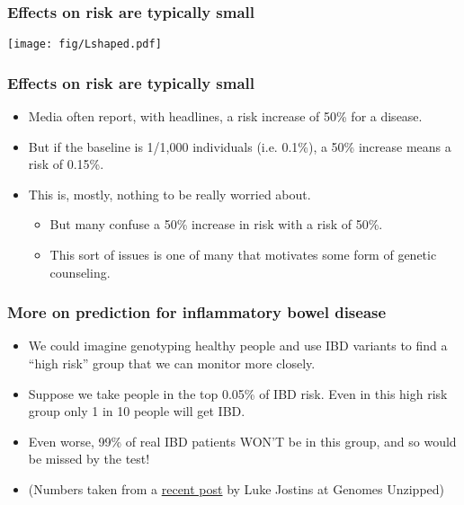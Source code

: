 \documentclass{beamer}
\begin{document}
\begin{frame}
  \frametitle{Effects on risk are typically small}
  \begin{center} 
    \texttt{[image: fig/Lshaped.pdf]}
  \end{center}
\end{frame}


\begin{frame}
  \frametitle{Effects on risk are typically small}
  \begin{itemize} 
    \item Media often report, with headlines, a risk increase of 50\% for a disease.
    \item But if the baseline is 1/1,000 individuals (i.e. 0.1\%), a 50\% increase means a risk of 0.15\%.
    \item This is, mostly, nothing to be really worried about.
      \begin{itemize}
      \item But many confuse a 50\% increase in risk with a risk of 50\%.
      \item This sort of issues is one of many that motivates some form of genetic counseling.
      \end{itemize}
  \end{itemize}
\end{frame}


\begin{frame}
  \frametitle{More on prediction for inflammatory bowel disease}
  \begin{itemize} 
  \item We could imagine genotyping healthy people and use IBD variants to find a “high risk” group that we can monitor more closely.
  \item Suppose we take people in the top 0.05\% of IBD risk. Even in this high risk group only 1 in 10 people will get IBD.
  \item Even worse, 99\% of real IBD patients WON’T be in this group, and so would be missed by the test!
  \item (Numbers taken from a \href{http://www.genomesunzipped.org/2012/11/dozens-of-new-ibd-genes-but-can-they-predict-disease.php\#more-5226}{recent post} by Luke Jostins at Genomes Unzipped)
  \end{itemize}
\end{frame}
\end{document}
